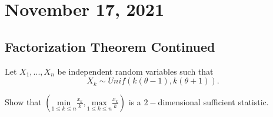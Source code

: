 \section{November 17, 2021}
\subsection{Factorization Theorem Continued}
\begin{example}
    Let $X_1,...,X_n$ be independent random variables such that $$X_k \sim Unif(k(\theta -1), k(\theta+1)).$$
    
    Show that $ \left ( \displaystyle \underset{1 \leq k \leq n}{\mathrm{min}} \frac{x_k}{k}, \underset{1 \leq k \leq n}{\mathrm{max}} \frac{x_k}{k}
    \right )$ is a $2-$dimensional sufficient statistic. 
    
\end{example}

